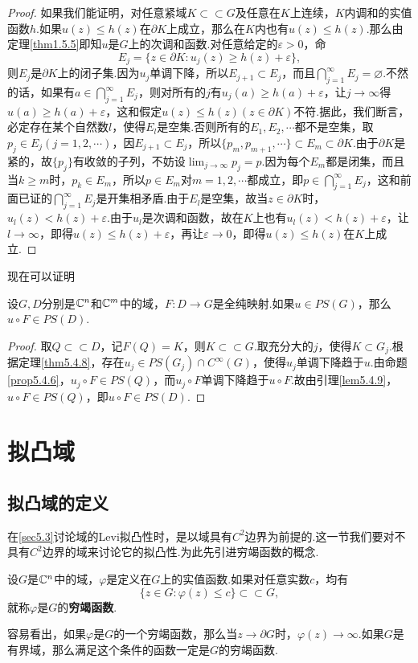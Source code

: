 \begin{proof}
	如果我们能证明，对任意紧域$K\subset\subset G$及任意在$K$上连续，$K$内调和的实值函数$h$.如果$u(z)\le h(z)$在$\partial K$上成立，那么在$K$内也有$u(z)\le h(z)$.那么由定理\ref{thm1.5.5}即知$u$是$G$上的次调和函数.对任意给定的$\varepsilon>0$，命
	\[E_j=\{z\in\partial K\colon u_j(z)\ge h(z)+\varepsilon\},\]
	则$E_j$是$\partial K$上的闭子集.因为$u_j$单调下降，所以$E_{j+1}\subset E_j$，而且$\bigcap_{j=1}^\infty E_j=\varnothing$.不然的话，如果有$a\in\bigcap_{j=1}^\infty E_j$，则对所有的$j$有$u_j(a)\ge h(a)+\varepsilon$，让$j\to\infty$得$u(a)\ge h(a)+\varepsilon$，这和假定$u(z)\le h(z)(z\in\partial K)$不符.据此，我们断言，必定存在某个自然数$l$，使得$E_l$是空集.否则所有的$E_1,E_2,\cdots$都不是空集，取$p_j\in E_j(j=1,2,\cdots)$，因$E_{j+1}\subset E_j$，所以$\{p_m,p_{m+1},\cdots\}\subset E_m\subset\partial K$.由于$\partial K$是紧的，故$\{p_j\}$有收敛的子列，不妨设$\lim_{j\to\infty} p_j=p$.因为每个$E_m$都是闭集，而且当$k\ge m$时，$p_k\in E_m$，所以$p\in E_m$对$m=1,2,\cdots$都成立，即$p\in\bigcap_{j=1}^\infty E_j$，这和前面已证的$\bigcap_{j=1}^\infty E_j$是开集相矛盾.由于$E_l$是空集，故当$z\in\partial K$时，$u_l(z)<h(z)+\varepsilon$.由于$u_l$是次调和函数，故在$K$上也有$u_l(z)<h(z)+\varepsilon$，让$l\to\infty$，即得$u(z)\le h(z)+\varepsilon$，再让$\varepsilon\to0$，即得$u(z)\le h(z)$在$K$上成立.
\end{proof}
现在可以证明
\begin{theorem}\label{thm5.4.10}
	设$G,D$分别是$\mathbb C^n$和$\mathbb C^m$中的域，$F\colon D\to G$是全纯映射.如果$u\in PS(G)$，那么$u\circ F\in PS(D)$.
\end{theorem}
\begin{proof}
	取$Q\subset\subset D$，记$F(Q)=K$，则$K\subset\subset G$.取充分大的$j$，使得$K\subset G_j$.根据定理\ref{thm5.4.8}，存在$u_j\in PS(G_j)\cap C^\infty(G)$，使得$u_j$单调下降趋于$u$.由命题\ref{prop5.4.6}，$u_j\circ F\in PS(Q)$，而$u_j\circ F$单调下降趋于$u\circ F$.故由引理\ref{lem5.4.9}，$u\circ F\in PS(Q)$，即$u\circ F\in PS(D)$.
\end{proof}
\section{拟凸域\label{sec5.5.1}}
\subsection{拟凸域的定义}
在\ref{sec5.3}讨论域的Levi拟凸性时，是以域具有$C^2$边界为前提的.这一节我们要对不具有$C^2$边界的域来讨论它的拟凸性.为此先引进穷竭函数的概念.
\begin{definition}\label{def5.5.1}
	设$G$是$\mathbb C^n$中的域，$\varphi$是定义在$G$上的实值函数.如果对任意实数$c$，均有
	\begin{equation}\label{eq5.5.1}
		\{z\in G\colon\varphi(z)\le c\}\subset\subset G,
	\end{equation}
就称$\varphi$是$G$的\textbf{穷竭函数}.
\end{definition}
容易看出，如果$\varphi$是$G$的一个穷竭函数，那么当$z\to\partial G$时，$\varphi(z)\to\infty$.如果$G$是有界域，那么满足这个条件的函数一定是$G$的穷竭函数.

